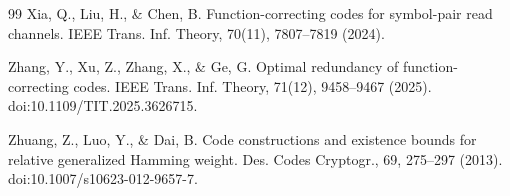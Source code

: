\documentclass[a4paper,12pt]{article}
\theoremstyle{plain}
\theoremstyle{definition}
\begin{document}
\begin{thebibliography}{99}
Xia, Q., Liu, H., \& Chen, B.
Function-correcting codes for symbol-pair read channels.
IEEE Trans. Inf. Theory, 70(11), 7807--7819 (2024).

Zhang, Y., Xu, Z., Zhang, X., \& Ge, G.
Optimal redundancy of function-correcting codes.
IEEE Trans. Inf. Theory, 71(12), 9458--9467 (2025).
doi:10.1109/TIT.2025.3626715.

Zhuang, Z., Luo, Y., \& Dai, B.
Code constructions and existence bounds for relative generalized Hamming weight.
Des. Codes Cryptogr., 69, 275--297 (2013).
doi:10.1007/s10623-012-9657-7.

\end{thebibliography}
\end{document}
